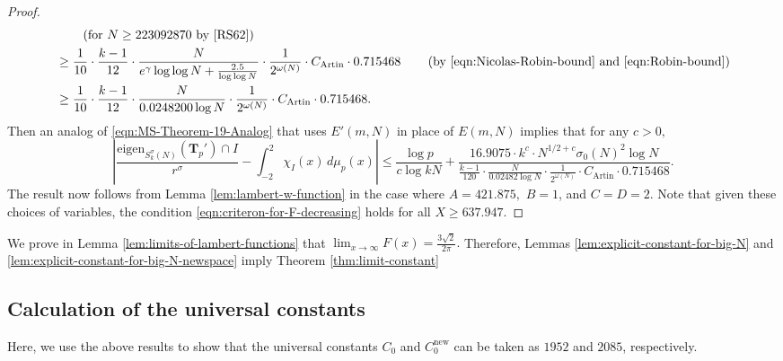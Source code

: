 \documentclass[11pt,letterpaper,reqno]{amsart}
\theoremstyle{definition}
\numberwithin{equation}{section}
\numberwithin{figure}{section}
\numberwithin{table}{section}
\let\subsectiontemp\subsection
\renewcommand{\subsection}[1]{ 
    \subsectiontemp{#1} \hfill\vspace{0.5\linespacing} 
}
\newcommand{\nw}{\mathrm{new}}
\begin{document}
\begin{proof}
\begin{align}
        & \qquad \left( \text{for $N \geq 223 092 870$ by \cite[Theorem 15]{RS62}}  \right)\\
        & \geq \frac{1}{10} \cdot \frac{k - 1}{12} \cdot \frac{N}{e^{\gamma} \log\log N + \frac{2.5}{\log \log N}} \cdot \frac{1}{2^{\omega(N)}} \cdot C_{\text{Artin}} \cdot  0.715468 \qquad \left( \text{by \eqref{eqn:Nicolas-Robin-bound} and \eqref{eqn:Robin-bound}}  \right)\\
        & \geq \frac{1}{10} \cdot \frac{k - 1}{12} \cdot \frac{N}{0.0248200 \log N} \cdot \frac{1}{2^{\omega(N)}} \cdot C_{\text{Artin}} \cdot  0.715468.
    \end{align}
    Then an analog of \eqref{eqn:MS-Theorem-19-Analog} that uses $E'(m, N)$ in place of $E(m, N)$ implies that for any $c >0,$
    $$\left| \frac{\text{eigen}_{S_k^\sigma(N)}(\mathbf{T}_p') \cap I}{r^\sigma} - \int_{-2}^2 \chi_I(x) \, d \mu_p(x)  \right| \leq \frac{\log p}{c \log kN} + \frac{16.9075 \cdot k^c \cdot N^{1/2 + c} \sigma_0(N)^2 \log N}{\frac{k - 1}{120} \cdot \frac{N}{0.02482 \log N} \cdot \frac{1}{2^{\omega(N)}} \cdot C_{\text{Artin}} \cdot  0.715468}.$$
The result now follows from Lemma \ref{lem:lambert-w-function} in the case where $A = 421.875,$ $B = 1$, and $C = D = 2.$ Note that given these choices of variables, the condition \eqref{eqn:criteron-for-F-decreasing} holds for all $X \geq 637.947.$
\end{proof}

We prove in Lemma \ref{lem:limits-of-lambert-functions} that
$\lim_{x \rightarrow \infty} F(x) = \frac{3\sqrt{2}}{2\pi}.$ Therefore, Lemmas \ref{lem:explicit-constant-for-big-N} and \ref{lem:explicit-constant-for-big-N-newspace} imply Theorem \ref{thm:limit-constant}

\subsection{Calculation of the universal constants}\label{subsection:c-upper-bound}

Here, we use the above results to show that the universal constants $C_0$ and $C_0^\nw$ can be taken as $1952$ and $2085$, respectively.
\end{document}
